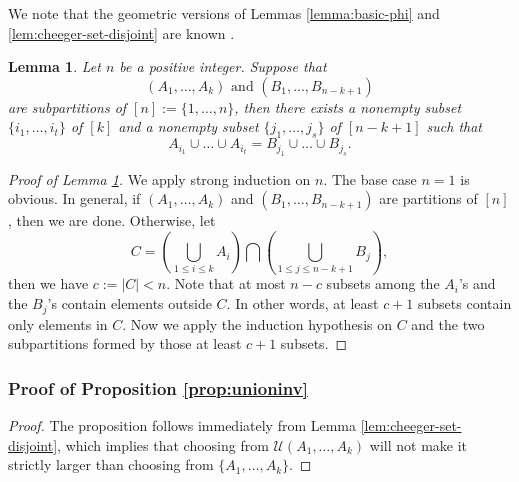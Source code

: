 \documentclass[12pt, reqno]{article}
\newtheorem{lemma}{Lemma}
\begin{document}
We note that the geometric versions of Lemmas \ref{lemma:basic-phi} and \ref{lem:cheeger-set-disjoint} are known \cite{Bobkov-Parini,Mazon}. 

\begin{lemma}\label{lem:pigeonhole}
Let $n$ be a positive integer. Suppose that \[(A_1,\dots,A_k)\text{ and }(B_1,\dots,B_{n-k+1})\] are subpartitions of $[n]:=\{1,\dots, n\}$, then there exists a nonempty subset $\{i_1,\dots,i_t\}$ of $[k]$ and a nonempty subset $\{j_1,\dots,j_s\}$ of $[n-k+1]$ such that \[A_{i_1}\cup\dots\cup A_{i_t}=B_{j_1}\cup\dots\cup B_{j_s}.\]
\end{lemma}

\begin{proof}[Proof of Lemma \ref{lem:pigeonhole}]
We apply strong induction on $n$. The base case $n=1$ is obvious. In general, if $(A_1,\dots,A_k)$ and $(B_1,\dots,B_{n-k+1})$ are partitions of $[n]$, then we are done. Otherwise, let \[C=\left(\bigcup_{1\le i\le k} A_i\right)\bigcap\left(\bigcup_{1\le j\le n-k+1} B_j\right),\] then we have $c:=|C|<n$. Note that at most $n-c$ subsets among the $A_i$'s and the $B_j$'s contain elements outside $C$. In other words, at least $c+1$ subsets contain only elements in $C$. Now we apply the induction hypothesis on $C$ and the two subpartitions formed by those at least $c+1$ subsets.
\end{proof}

\subsubsection{Proof of Proposition \ref{prop:unioninv}}
\begin{proof}
The proposition follows immediately from Lemma \ref{lem:cheeger-set-disjoint}, which implies that choosing from $\mathcal U(A_1,\dots,A_k)$ will not make it strictly larger than choosing from $\{A_1,\dots,A_k\}$.
\end{proof}
\end{document}
